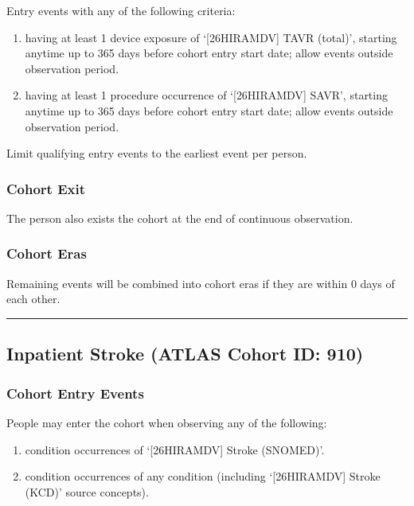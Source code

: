 \documentclass[
  12pt,
]{article}
\providecommand{\tightlist}{%
  \setlength{\itemsep}{0pt}\setlength{\parskip}{0pt}}
\begin{document}
Entry events with any of the following criteria:

\begin{enumerate}
\def\labelenumi{\arabic{enumi}.}
\tightlist
\item
  having at least 1 device exposure of `{[}26HIRAMDV{]} TAVR (total)',
  starting anytime up to 365 days before cohort entry start date; allow
  events outside observation period.
\item
  having at least 1 procedure occurrence of `{[}26HIRAMDV{]} SAVR',
  starting anytime up to 365 days before cohort entry start date; allow
  events outside observation period.
\end{enumerate}

Limit qualifying entry events to the earliest event per person.

\subsubsection{Cohort Exit}\label{cohort-exit-9}

The person also exists the cohort at the end of continuous observation.

\subsubsection{Cohort Eras}\label{cohort-eras-9}

Remaining events will be combined into cohort eras if they are within 0
days of each other.

\begin{center}\rule{0.5\linewidth}{0.5pt}\end{center}

\subsection{Inpatient Stroke (ATLAS Cohort ID:
910)}\label{inpatient-stroke-atlas-cohort-id-910}

\subsubsection{Cohort Entry Events}\label{cohort-entry-events-10}

People may enter the cohort when observing any of the following:

\begin{enumerate}
\def\labelenumi{\arabic{enumi}.}
\item
  condition occurrences of `{[}26HIRAMDV{]} Stroke (SNOMED)'.
\item
  condition occurrences of any condition (including `{[}26HIRAMDV{]}
  Stroke (KCD)' source concepts).
\end{enumerate}
\end{document}
